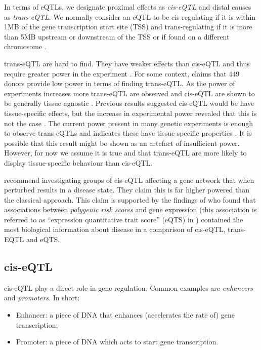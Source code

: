 \documentclass[a4paper,10pt]{article}
\begin{document}
In terms of eQTLs, we designate proximal effects as \emph{cis-eQTL} and distal causes as 
\emph{trans-eQTL}. We normally consider an eQTL to be cis-regulating if it is within 1MB of the 
gene transcription start site (TSS) and trans-regulating if it is more than 5MB upstream or 
downstream of the TSS or if found on a different chromosome \cite{nica_expression_2013}.

trans-eQTL are hard to find. They have weaker effects than cis-eQTL and thus require greater power 
in the experiment \cite{dixon_genome-wide_2007}. For some context, \citet{burgess_gene_2017} claims 
that 449 donors provide low power in terms of finding trans-eQTL. As the power of experiments increases 
more trans-eQTL are observed and cis-eQTL are shown to be generally tissue agnostic 
\cite{gtex_consortium_genetic_2017}. Previous results suggested cis-eQTL would be have tissue-specific effects, 
but the increase in experimental power revealed that this is not the case \cite{grundberg_mapping_2012}. 
The current power present in many genetic experiments is enough to observe trans-eQTLs and indicates 
these have tissue-specific properties \cite{grundberg_mapping_2012}\cite{gtex_consortium_genetic_2017}. It is possible that this result might be shown as an artefact of insufficient power. However, for now 
we assume it is true and that trans-eQTL are more likely to display tissue-specific behaviour 
than cis-eQTL.

\citet{nica_expression_2013} recommend investigating groups of cis-eQTL affecting a gene network that 
when perturbed results in a disease state. They claim this is far higher powered than the classical 
approach. This claim is supported by the findings of \citet{vosa_unraveling_2018} who found that 
associations between \emph{polygenic risk scores} and gene expression (this association is referred 
to as ``expression quantitative trait score'' (eQTS) in \cite{vosa_unraveling_2018}) contained the 
most biological information about disease in a comparison of cis-eQTL, trans-EQTL and eQTS.

\subsection{cis-eQTL}
cis-eQTL play a direct role in gene regulation. Common examples are \emph{enhancers} and \emph{promoters}.
In short:
\begin{itemize}
 \item Enhancer: a piece of DNA that enhances (accelerates the rate of) gene transcription;
 \item Promoter: a piece of DNA which acts to start gene transcription.
\end{itemize}
\end{document}
